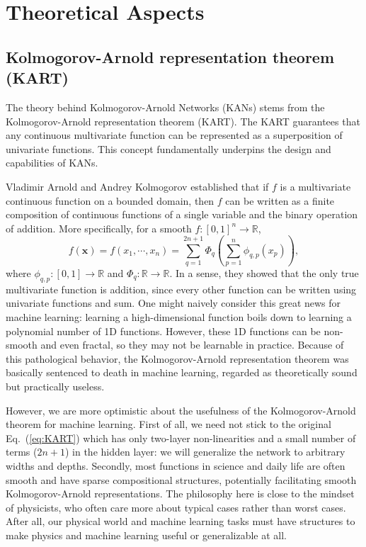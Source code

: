 \chapter{Theoretical Aspects}


\section{Kolmogorov-Arnold representation theorem (KART)}

The theory behind Kolmogorov-Arnold Networks (KANs) stems from the Kolmogorov-Arnold representation theorem (KART). The KART guarantees that any continuous multivariate function can be represented as a superposition of univariate functions. This concept fundamentally underpins the design and capabilities of KANs.

Vladimir Arnold and Andrey Kolmogorov established that if $f$ is a multivariate continuous function on a bounded domain, then $f$ can be written as a finite composition of continuous functions of a single variable and the binary operation of addition. More specifically, for a smooth $f:[0,1]^n\to\mathbb{R}$,
\begin{equation}\label{eq:KART}
    f(\mathbf{x}) = f(x_1,\cdots,x_n)=\sum_{q=1}^{2n+1} \Phi_q\left(\sum_{p=1}^n\phi_{q,p}(x_p)\right),
\end{equation}
where $\phi_{q,p}:[0,1]\to\mathbb{R}$ and $\Phi_q:\mathbb{R}\to\mathbb{R}$. In a sense, they showed that the only true multivariate function is addition, since every other function can be written using univariate functions and sum. One might naively consider this great news for machine learning: learning a high-dimensional function boils down to learning a polynomial number of 1D functions. However, these 1D functions can be non-smooth and even fractal, so they may not be learnable in practice. Because of this pathological behavior, the Kolmogorov-Arnold representation theorem was basically sentenced to death in machine learning, regarded as theoretically sound but practically useless.

However, we are more optimistic about the usefulness of the Kolmogorov-Arnold theorem for machine learning. First of all, we need not stick to the original Eq.~(\ref{eq:KART}) which has only two-layer non-linearities and a small number of terms ($2n+1$) in the hidden layer: we will generalize the network to arbitrary widths and depths. Secondly, most functions in science and daily life are often smooth and have sparse  compositional structures, potentially facilitating smooth Kolmogorov-Arnold representations. The philosophy here is close to the mindset of physicists, who often care more about typical cases rather than worst cases. After all, our physical world and machine learning tasks must have structures to make physics and machine learning useful or generalizable at all.

